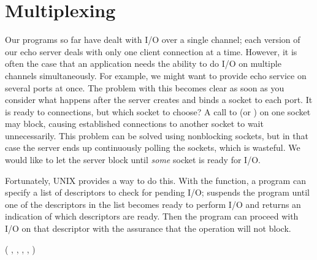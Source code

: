 \section{Multiplexing}
\label{sect:multiplexing}%

\noindent Our programs so far have dealt with I/O over a single
channel; each version of our echo server deals with
only one client connection at a time.
However, it is often the case that an application needs the ability to
do I/O on multiple channels simultaneously.  For example,
we  might want to provide echo service on several ports at once.
The problem with this becomes clear as soon as you consider what
happens after the server creates and binds a socket to each port.
It is ready to  connections, but which socket to
choose?
A call to  (or )
on one socket may block, causing
established connections to another socket to wait unnecessarily.
This problem can be solved using nonblocking sockets, but
in that case the server ends up continuously polling the sockets,
which is  wasteful.
We would like to let the server block until \emph{some} socket
is ready for I/O.

Fortunately, UNIX provides a way to do this.
With the  function, a program can specify a
list of descriptors to check for pending I/O;
suspends the program until one of the descriptors in the list
becomes ready to perform I/O and returns  an indication of which
descriptors are ready.
Then the program can proceed with I/O on that descriptor with the
assurance that the operation will not block.

\begin{inlinefcn}
 ( , , , ,   
)
\end{inlinefcn}

